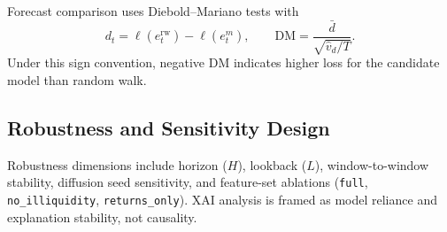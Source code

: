 Forecast comparison uses Diebold--Mariano tests \parencite{dieboldmariano1995} with
\begin{equation}
d_t=\ell(e_t^{\mathrm{rw}})-\ell(e_t^{m}), \qquad
\text{DM}=\frac{\bar{d}}{\sqrt{\widehat{v}_d/T}}.
\label{eq:dm}
\end{equation}
Under this sign convention, negative DM indicates higher loss for the candidate model than random walk.

\subsection{Robustness and Sensitivity Design}
Robustness dimensions include horizon (\(H\)), lookback (\(L\)), window-to-window stability, diffusion seed sensitivity, and feature-set ablations (\texttt{full}, \texttt{no\_illiquidity}, \texttt{returns\_only}). XAI analysis is framed as model reliance and explanation stability, not causality.
